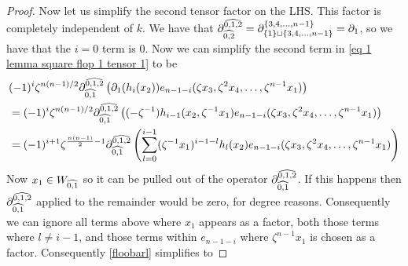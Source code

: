 \begin{proof}
    Now let us simplify the second tensor factor on the LHS. This factor is completely independent of $k$.
    We have that $\partial^{\widehat{0,1,2}}_{\widehat{0,2}}=\partial^{\{3, 4, \ldots , n-1\}}_{\{1\}\sqcup \{3,4, \ldots, n-1\}}=\partial_1$, so we have that the $i=0$ term is 0. 
    Now we can simplify the second term in \eqref{eq 1 lemma square flop 1 tensor 1} to be
    \begin{align} \label{floobarl}
    &(-1)^i\zeta^{n(n-1)/2} \partial^{\widehat{0,1,2}}_{\widehat{0,1}}\left( \partial_1(h_i(x_2))e_{n-1-i}(\zeta x_3, \zeta^2 x_4, \ldots , \zeta^{n-1}x_1) \right)\\ \nonumber
    &=(-1)^i\zeta^{n(n-1)/2} \partial^{\widehat{0,1,2}}_{\widehat{0,1}}\left( (-\zeta^{-1}) h_{i-1}(x_2, \zeta^{-1}x_1)e_{n-1-i}(\zeta x_3, \zeta^2 x_4, \ldots , \zeta^{n-1}x_1)
    \right)\\ \nonumber
    &=(-1)^{i+1}\zeta^{\frac{n(n-1)}{2} -1} \partial^{\widehat{0,1,2}}_{\widehat{0,1}}\left(
    \sum_{l=0}^{i-1}(\zeta^{-1}x_1)^{i-1-l}h_l(x_2)e_{n-1-i}(\zeta x_3, \zeta^2 x_4, \ldots , \zeta^{n-1}x_1)
    \right)\end{align}
    Now $x_1 \in W_{\widehat{0,1}}$ so it can be pulled out of the operator $\partial^{\widehat{0,1,2}}_{\widehat{0,1}}$. If this happens then $\partial^{\widehat{0,1,2}}_{\widehat{0,1}}$ applied to the remainder would be zero, for degree reasons. Consequently we can ignore all terms above where $x_1$ appears as a factor, both those terms where $l \ne i-1$, and those terms within $e_{n-1-i}$ where $\zeta^{n-1} x_1$ is chosen as a factor. Consequently \eqref{floobarl} simplifies to

\end{proof}
